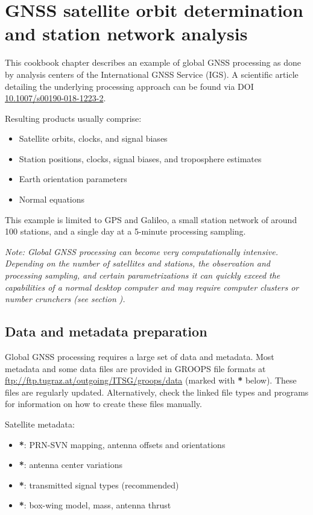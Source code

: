\section{GNSS satellite orbit determination and station network analysis}\label{cookbook.gnssNetwork}

This cookbook chapter describes an example of global GNSS processing as done by analysis centers of the
International GNSS Service (IGS). A scientific article detailing the underlying processing approach
can be found via DOI \href{https://doi.org/10.1007/s00190-018-1223-2}{10.1007/s00190-018-1223-2}.

Resulting products usually comprise:
\begin{itemize}
  \item Satellite orbits, clocks, and signal biases
  \item Station positions, clocks, signal biases, and troposphere estimates
  \item Earth orientation parameters
  \item Normal equations
\end{itemize}

This example is limited to GPS and Galileo, a small station network of around 100 stations, and a single day at a 5-minute
processing sampling.

\emph{Note: Global GNSS processing can become very computationally intensive. Depending on the number of satellites
and stations, the observation and processing sampling, and certain parametrizations it can quickly exceed the capabilities
of a normal desktop computer and may require computer clusters or number crunchers (see section}
\emph{).}

\subsection{Data and metadata preparation}

Global GNSS processing requires a large set of data and metadata. Most metadata and some data files are
provided in GROOPS file formats at \url{ftp://ftp.tugraz.at/outgoing/ITSG/groops/data}
(marked with \textbf{*} below). These files are regularly updated. Alternatively, check the linked
file types and programs for information on how to create these files manually.

Satellite metadata:
\begin{itemize}
  \item {}\textbf{*}: PRN-SVN mapping, antenna offsets and orientations
  \item {}\textbf{*}: antenna center variations
  \item {}\textbf{*}: transmitted signal types (recommended)
  \item {}\textbf{*}: box-wing model, mass, antenna thrust
\end{itemize}

